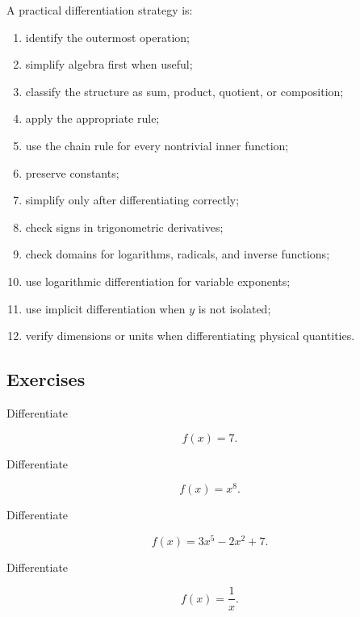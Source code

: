 A practical differentiation strategy is:

\begin{enumerate}
    \item identify the outermost operation;
    \item simplify algebra first when useful;
    \item classify the structure as sum, product, quotient, or composition;
    \item apply the appropriate rule;
    \item use the chain rule for every nontrivial inner function;
    \item preserve constants;
    \item simplify only after differentiating correctly;
    \item check signs in trigonometric derivatives;
    \item check domains for logarithms, radicals, and inverse functions;
    \item use logarithmic differentiation for variable exponents;
    \item use implicit differentiation when \(y\) is not isolated;
    \item verify dimensions or units when differentiating physical quantities.
\end{enumerate}

\subsection{Exercises}
\label{subsec:derivative-table-exercises}

\begin{exercise}[1]
Differentiate

\[
f(x)=7.
\]
\end{exercise}

\begin{exercise}[1]
Differentiate

\[
f(x)=x^8.
\]
\end{exercise}

\begin{exercise}[1]
Differentiate

\[
f(x)=3x^5-2x^2+7.
\]
\end{exercise}

\begin{exercise}[1]
Differentiate

\[
f(x)=\frac1x.
\]
\end{exercise}

